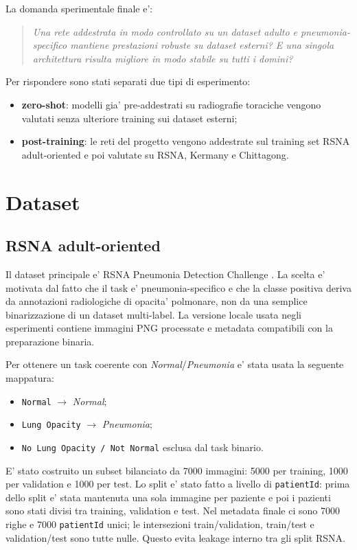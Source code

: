 \documentclass[11pt,a4paper]{article}
\newcommand{\normal}{\textit{Normal}}
\newcommand{\pneumonia}{\textit{Pneumonia}}
\begin{document}
La domanda sperimentale finale e':

\begin{quote}
\textit{Una rete addestrata in modo controllato su un dataset adulto e
pneumonia-specifico mantiene prestazioni robuste su dataset esterni? E una
singola architettura risulta migliore in modo stabile su tutti i domini?}
\end{quote}

Per rispondere sono stati separati due tipi di esperimento:

\begin{itemize}
  \item \textbf{zero-shot}: modelli gia' pre-addestrati su radiografie
  toraciche vengono valutati senza ulteriore training sui dataset esterni;
  \item \textbf{post-training}: le reti del progetto vengono addestrate sul
  training set RSNA adult-oriented e poi valutate su RSNA, Kermany e Chittagong.
\end{itemize}

\section{Dataset}

\subsection{RSNA adult-oriented}

Il dataset principale e' RSNA Pneumonia Detection Challenge
\cite{rsna_kaggle}. La scelta e' motivata dal fatto che il task e'
pneumonia-specifico e che la classe positiva deriva da annotazioni radiologiche
di opacita' polmonare, non da una semplice binarizzazione di un dataset
multi-label. La versione locale usata negli esperimenti contiene immagini PNG
processate e metadata compatibili con la preparazione binaria.

Per ottenere un task coerente con \normal/\pneumonia{} e' stata usata la
seguente mappatura:

\begin{itemize}
  \item \texttt{Normal} $\rightarrow$ \normal;
  \item \texttt{Lung Opacity} $\rightarrow$ \pneumonia;
  \item \texttt{No Lung Opacity / Not Normal} esclusa dal task binario.
\end{itemize}

E' stato costruito un subset bilanciato da 7000 immagini: 5000 per training,
1000 per validation e 1000 per test. Lo split e' stato fatto a livello di
\texttt{patientId}: prima dello split e' stata mantenuta una sola immagine per
paziente e poi i pazienti sono stati divisi tra training, validation e test.
Nel metadata finale ci sono 7000 righe e 7000 \texttt{patientId} unici; le
intersezioni train/validation, train/test e validation/test sono tutte nulle.
Questo evita leakage interno tra gli split RSNA.
\end{document}
